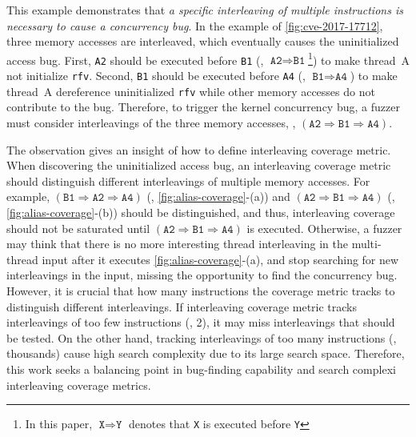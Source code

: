 %
This example demonstrates that \textit{a specific interleaving of
  multiple instructions is necessary to cause a concurrency bug}.
%
In the example of \autoref{fig:cve-2017-17712}, three memory accesses
are interleaved, which eventually causes the uninitialized access bug.
%
First, \texttt{A2} should be executed before \texttt{B1} (\ie,
$\texttt{A2} \Rightarrow \texttt{B1}$\footnote{In this paper,
  $\texttt{X} \Rightarrow \texttt{Y}$ denotes that \texttt{X} is
  executed before \texttt{Y}}) to make thread~A not initialize
\texttt{rfv}.
%
Second, \texttt{B1} should be executed before \texttt{A4} (\ie,
$\texttt{B1} \Rightarrow \texttt{A4}$) to make thread~A dereference
uninitialized \texttt{rfv} while other memory accesses do not
contribute to the bug.
%
Therefore, to trigger the kernel concurrency bug, a fuzzer must
consider interleavings of the three memory accesses, \eg,
$(\texttt{A2} \Rightarrow \texttt{B1} \Rightarrow \texttt{A4})$.


%
The observation gives an insight of how to define interleaving
coverage metric.
%
When discovering the uninitialized access bug, an interleaving
coverage metric should distinguish different interleavings of multiple
memory accesses.
%
For example,
$(\texttt{B1} \Rightarrow \texttt{A2} \Rightarrow \texttt{A4})$ (\ie,
\autoref{fig:alias-coverage}-(a)) and
$(\texttt{A2} \Rightarrow \texttt{B1} \Rightarrow \texttt{A4})$ (\ie,
\autoref{fig:alias-coverage}-(b)) should be distinguished, and thus,
interleaving coverage should not be saturated until
$(\texttt{A2} \Rightarrow \texttt{B1} \Rightarrow \texttt{A4})$ is
executed.
%
Otherwise, a fuzzer may think that there is no more interesting thread
interleaving in the multi-thread input after it executes
\autoref{fig:alias-coverage}-(a), and stop searching for new
interleavings in the input, missing the opportunity to 
find the concurrency bug.
%
However, it is crucial that how many instructions the coverage 
metric tracks to distinguish different interleavings.
If interleaving coverage metric tracks interleavings 
of too few instructions (\eg, 2), it may miss interleavings 
that should be tested. On the other hand, tracking interleavings 
of too many instructions (\eg, thousands) cause high search 
complexity due to its large search space.
Therefore, this work seeks a balancing point in bug-finding 
capability and search complexi
  interleaving coverage metrics.

